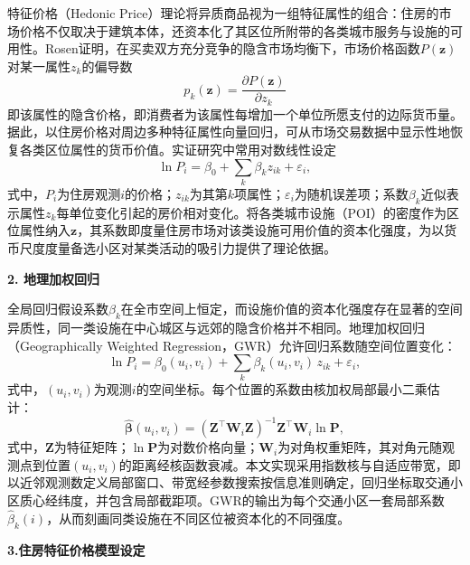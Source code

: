 特征价格（Hedonic Price）理论将异质商品视为一组特征属性的组合\citep{lancasterNewApproachConsumer1966}：住房的市场价格不仅取决于建筑本体，还资本化了其区位所附带的各类城市服务与设施的可用性。Rosen\citep{rosenHedonicPricesImplicit1974}证明，在买卖双方充分竞争的隐含市场均衡下，市场价格函数$P(\mathbf{z})$对某一属性$z_k$的偏导数
\begin{equation}
p_k(\mathbf{z})=\frac{\partial P(\mathbf{z})}{\partial z_k}
\label{eq.hedonic.implicit}
\end{equation}
即该属性的隐含价格，即消费者为该属性每增加一个单位所愿支付的边际货币量。据此，以住房价格对周边多种特征属性向量回归，可从市场交易数据中显示性地恢复各类区位属性的货币价值。实证研究中常用对数线性设定
\begin{equation}
\ln P_i=\beta_0+\sum_{k}\beta_k z_{ik}+\varepsilon_i,
\label{eq.hedonic.loglinear}
\end{equation}
式中，$P_i$为住房观测$i$的价格；$z_{ik}$为其第$k$项属性；$\varepsilon_i$为随机误差项；系数$\beta_k$近似表示属性$z_k$每单位变化引起的房价相对变化。将各类城市设施（POI）的密度作为区位属性纳入$\mathbf{z}$，其系数即度量住房市场对该类设施可用价值的资本化强度，为以货币尺度度量备选小区对某类活动的吸引力提供了理论依据。

\textbf{2. 地理加权回归}

全局回归假设系数$\beta_k$在全市空间上恒定，而设施价值的资本化强度存在显著的空间异质性，同一类设施在中心城区与远郊的隐含价格并不相同。地理加权回归（Geographically Weighted Regression，GWR）\citep{fotheringhamGeographicallyWeightedRegression2009}允许回归系数随空间位置变化：
\begin{equation}
\ln P_i=\beta_0(u_i,v_i)+\sum_{k}\beta_k(u_i,v_i)\,z_{ik}+\varepsilon_i,
\label{eq.hedonic.gwr}
\end{equation}
式中，$(u_i,v_i)$为观测$i$的空间坐标。每个位置的系数由核加权局部最小二乘估计：
\begin{equation}
\hat{\boldsymbol{\beta}}(u_i,v_i)=\left(\mathbf{Z}^{\top}\mathbf{W}_i\mathbf{Z}\right)^{-1}\mathbf{Z}^{\top}\mathbf{W}_i\ln\mathbf{P},
\label{eq.hedonic.gwrest}
\end{equation}
式中，$\mathbf{Z}$为特征矩阵；$\ln\mathbf{P}$为对数价格向量；$\mathbf{W}_i$为对角权重矩阵，其对角元随观测点到位置$(u_i,v_i)$的距离经核函数衰减。本文实现采用指数核与自适应带宽，即以近邻观测数定义局部窗口、带宽经参数搜索按信息准则确定，回归坐标取交通小区质心经纬度，并包含局部截距项。GWR的输出为每个交通小区一套局部系数$\hat{\beta}_k(i)$，从而刻画同类设施在不同区位被资本化的不同强度。

\textbf{3.住房特征价格模型设定}

